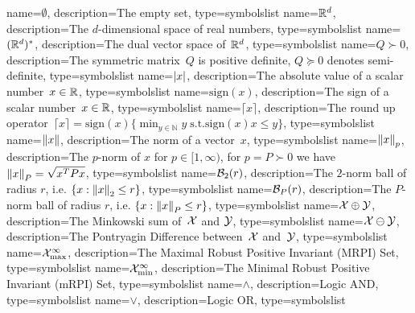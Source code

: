 %
%
%
%
%
%
  {
    name={\ensuremath{\emptyset}},
    description={The empty set},
    type=symbolslist
  }
%
{
	name={\ensuremath{\RR^d}},
	description={The $d$-dimensional space of real numbers},
	type=symbolslist
}
%
{
	name={\ensuremath{(\RR^d)^\ast}},
	description={The dual vector space of~$\mathbb R^d$},
	type=symbolslist
}
%
{
	name={\ensuremath{Q\succ0}},
	description={The symmetric matrix~$Q$ is positive definite, $Q\succeq0$ denotes semi-definite},
	type=symbolslist
}
%
  {
    name={\ensuremath{\abs{x}}},
    description={The absolute value of a scalar number~$x\in\mathbb R$},
    type=symbolslist
  }
%
  {
    name={\ensuremath{\text{sign}(x)}},
    description={The sign of a scalar number~$x\in\mathbb R$},
    type=symbolslist
  }
%
  {
    name={\ensuremath{\lceil x\rceil}},
    description={The round up operator~$\lceil x\rceil=\text{sign}(x)\{\min_{y\in\mathbb N}y\;\text{s.t.}\text{sign}(x)x\leq y\}$},
    type=symbolslist
  }
%
{
	name={\ensuremath{\norm{x}}},
	description={The norm of a vector~$x$},
	type=symbolslist
}
%
{
	name={\ensuremath{\norm{x}_p}},
	description={The $p$-norm of $x$ for $p\in[1,\infty)$, for $p=P\succ0$ we have $\left\|x\right\|_P=\sqrt{x^TPx}$},
	type=symbolslist
}
%
{
	name={\ensuremath{\ball_2(r)}},
	description={The $2$-norm ball of radius $r$, i.e. $\{x:\left\|x\right\|_2\leq r\}$},
	type=symbolslist
}
%
{
	name={\ensuremath{\ball_P(r)}},
	description={The $P$-norm ball of radius $r$, i.e. $\{x:\left\|x\right\|_P\leq r\}$},
	type=symbolslist
}
%
{
	name={\ensuremath{\X\oplus\Y}},
	description={The Minkowski sum of~$\mathcal X$ and $\mathcal Y$},
	type=symbolslist
}
%
{
	name={\ensuremath{\X\ominus\Y}},
	description={The Pontryagin Difference between~$\mathcal X$ and~$\mathcal Y$},
	type=symbolslist
}
%
{
	name={\ensuremath{\X^{\infty}_{\max}}},
	description={The Maximal Robust Positive Invariant (MRPI) Set},
	type=symbolslist
}
%
{
	name={\ensuremath{\X^{\infty}_{\min}}},
	description={The Minimal Robust Positive Invariant (mRPI) Set},
	type=symbolslist
}
%
{
	name={\ensuremath{\wedge}},
	description={Logic AND},
	type=symbolslist
}
%
{
	name={\ensuremath{\vee}},
	description={Logic OR},
	type=symbolslist
}
%
